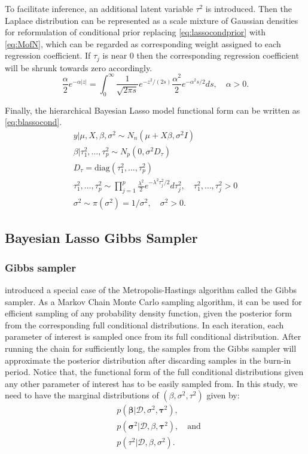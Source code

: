 To facilitate inference, an additional latent variable $\tau^2$ is introduced.
Then the Laplace distribution can be represented as a scale mixture of Gaussian densities for reformulation of conditional prior replacing \autoref{eq:lassocondprior} with \autoref{eq:MofN}, which can be regarded as corresponding weight assigned to each regression coefficient. If $\tau_j$ is near 0 then the corresponding regression coefficient will be shrunk towards zero accordingly.
\begin{equation}
	\label{eq:MofN}
	\frac{\alpha}{2}e^{-\alpha|z|} = \int_{0}^{\infty} \frac{1}{\sqrt{2\pi s}}e^{-z^2/(2s)} \frac{\alpha^2}{2}e^{-\alpha^2s/2}ds, \quad \alpha > 0.
\end{equation}

Finally, the hierarchical Bayesian Lasso model functional form can be written as \autoref{eq:blassocond}.
\begin{equation}
	\label{eq:blassocond}
	\begin{multlined}
		y|\mu,X,\beta,\sigma^2 \sim N_n(\mu + X\beta,\sigma^2I)\\
		\beta|\tau_1^2,\ldots,\tau_p^2 \sim N_p(0,\sigma^2D_{\tau})\\
		D_{\tau} = \text{diag}(\tau_1^2,...,\tau_p^2)\\
		\tau_1^2,\ldots,\tau_p^2 \sim \prod_{j=1}^p \frac{\lambda^2}{2} e^{-\lambda^2\tau_j^2/2}d\tau_j^2,  \quad \tau_1^2,\ldots, \tau_j^2 > 0\\
		\sigma^2 \sim \pi(\sigma^2) = 1/\sigma^2, \quad  \sigma^2 > 0.
	\end{multlined}
\end{equation}
\subsection{Bayesian Lasso Gibbs Sampler}
\subsubsection{Gibbs sampler}
\cite{4767596} introduced a special case of the Metropolis-Hastings algorithm called the Gibbs sampler. As a Markov Chain Monte Carlo sampling algorithm, it can be used for efficient sampling of any probability density function, given the posterior form from the corresponding full conditional distributions. In each iteration, each parameter of interest is sampled once from its full conditional distribution. After running the chain for sufficiently long, the samples from the Gibbs sampler will approximate the posterior distribution after discarding samples in the burn-in period. Notice that, the functional form of the full conditional distributions given any other parameter of interest has to be easily sampled from. In this study, we need to have the marginal distributions of  $(\beta,\sigma^2,\tau^2)$ given by:
\begin{align*}
    &p(\mathbf{\beta}|\mathcal{D},\sigma^2,\mathbf{\tau}^2),\\
	&p(\mathbf{\sigma}^2|\mathcal{D},\beta,\mathbf{\tau}^2), \quad \mbox{and}\\
   &p(\tau^2|\mathcal{D},\beta,\sigma^2).
\end{align*}

